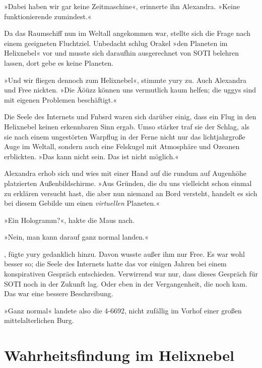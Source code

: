 »Dabei haben wir gar keine Zeitmaschine«, erinnerte ihn Alexandra. »Keine funktionierende zumindest.«

Da das Raumschiff nun im Weltall angekommen war, stellte sich die Frage nach einem geeigneten Fluchtziel. Unbedacht schlug Orakel »den Planeten im Helixnebel« vor und musste sich daraufhin ausgerechnet von SOTI belehren lassen, dort gebe es keine Planeten.

»Und wir fliegen dennoch zum Helixnebel«, stimmte yury zu. Auch Alexandra und Free nickten. »Die Äöüzz können uns vermutlich kaum helfen; die uggys sind mit eigenen Problemen beschäftigt.«

Die Seele des Internets und Fnbsrd waren sich darüber einig, dass ein Flug in den Helixnebel keinen erkennbaren Sinn ergab. Umso stärker traf sie der Schlag, als sie nach einem ungestörten Warpflug in der Ferne nicht nur das lichtjahrgroße Auge im Weltall, sondern auch eine Felskugel mit Atmosphäre und Ozeanen erblickten. »Das kann nicht sein. Das ist nicht möglich.«

Alexandra erhob sich und wies mit einer Hand auf die rundum auf Augenhöhe platzierten Außenbildschirme. »Aus Gründen, die du uns vielleicht schon einmal zu erklären versucht hast, die aber nun niemand an Bord versteht, handelt es sich bei diesem Gebilde um einen \emph{virtuellen} Planeten.«

»Ein Hologramm?«, hakte die Maus nach.

»Nein, man kann darauf ganz normal landen.«

, fügte yury gedanklich hinzu. Davon wusste außer ihm nur Free. Es war wohl besser so; die Seele des Internets hatte das vor einigen Jahren bei einem konspirativen Gespräch entschieden. Verwirrend war nur, dass dieses Gespräch für SOTI noch in der Zukunft lag. Oder eben in der Vergangenheit, die noch kam. Das war eine bessere Beschreibung.

»Ganz normal« landete also die 4-6692, nicht zufällig im Vorhof einer großen mittelalterlichen Burg.


\chapter{Wahrheitsfindung im Helixnebel}


